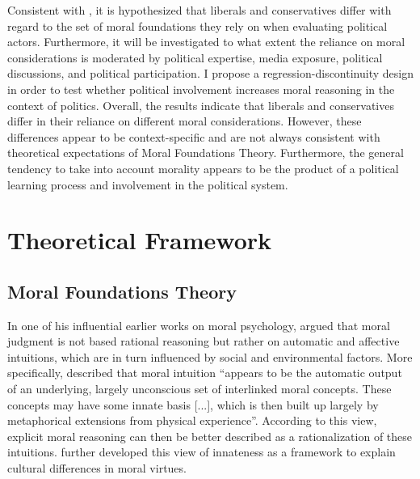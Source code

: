 \documentclass[12pt]{article}
\begin{document}
Consistent with \citet{graham2009liberals}, it is hypothesized that liberals and conservatives differ with regard to the set of moral foundations they rely on when evaluating political actors. Furthermore, it will be investigated to what extent the reliance on moral considerations is moderated by political expertise, media exposure, political discussions, and political participation. I propose a regression-discontinuity design in order to test whether political involvement increases moral reasoning in the context of politics. Overall, the results indicate that liberals and conservatives differ in their reliance on different moral considerations. However, these differences appear to be context-specific and are not always consistent with theoretical expectations of Moral Foundations Theory. Furthermore, the general tendency to take into account morality appears to be the product of a political learning process and involvement in the political system.

\section{Theoretical Framework}

\subsection{Moral Foundations Theory}

In one of his influential earlier works on moral psychology, \citet{haidt2001emotional} argued that moral judgment is not based rational reasoning but rather on automatic and affective intuitions, which are in turn influenced by social and environmental factors. More specifically, \citet[825]{haidt2001emotional} described that moral intuition ``appears to be the automatic output of an underlying, largely unconscious set of interlinked moral concepts. These concepts may have some innate basis [...], which is then built up largely by metaphorical extensions from physical experience''. According to this view, explicit moral reasoning can then be better described as a rationalization of these intuitions. \citet{haidt2004intuitive} further developed this view of innateness as a framework to explain cultural differences in moral virtues.
\end{document}
